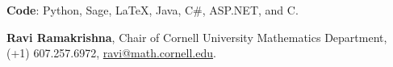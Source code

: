 \documentclass[11pt, letterpaper]{awesome-cv}
\begin{document}

\begin{cvparagraph}
\textbf{Code}: Python, Sage, \LaTeX, Java, C\#, ASP.NET, and C.
\end{cvparagraph}






\begin{cvparagraph}
\textbf{Ravi Ramakrishna}, Chair of Cornell University Mathematics Department, 
(+1) 607.257.6972, \href{mailto:ravi@math.cornell.edu}{ravi@math.cornell.edu}.
\end{cvparagraph}
\end{document}
